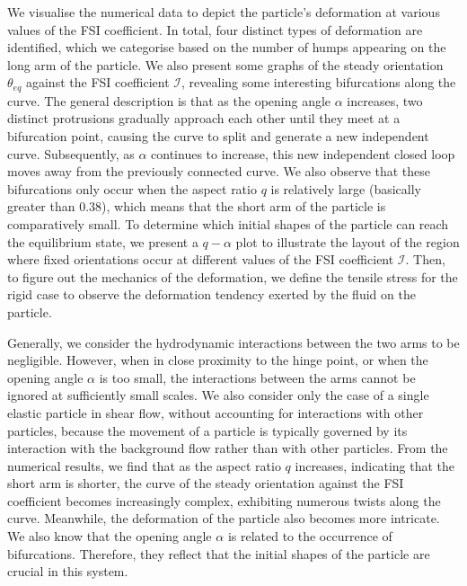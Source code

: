 \documentclass[12pt,MSc,twoside]{muthesis_2020}
\begin{document}
We visualise the numerical data to depict the particle's deformation at various values of the FSI coefficient. In total, four distinct types of deformation are identified, which we categorise based on the number of humps appearing on the long arm of the particle. We also present some graphs of the steady orientation $\theta_{eq}$ against the FSI coefficient $\mathcal{I}$, revealing some interesting bifurcations along the curve. The general description is that as the opening angle $\alpha$ increases, two distinct protrusions gradually approach each other until they meet at a bifurcation point, causing the curve to split and generate a new independent curve. Subsequently, as $\alpha$ continues to increase, this new independent closed loop moves away from the previously connected curve. We also observe that these bifurcations only occur when the aspect ratio $q$ is relatively large (basically greater than $0.38$), which means that the short arm of the particle is comparatively small. To determine which initial shapes of the particle can reach the equilibrium state, we present a $q-\alpha$ plot to illustrate the layout of the region where fixed orientations occur at different values of the FSI coefficient $\mathcal{I}$. Then, to figure out the mechanics of the deformation, we define the tensile stress for the rigid case to observe the deformation tendency exerted by the fluid on the particle.

Generally, we consider the hydrodynamic interactions between the two arms to be negligible. However, when in close proximity to the hinge point, or when the opening angle $\alpha$ is too small, the interactions between the arms cannot be ignored at sufficiently small scales. We also consider only the case of a single elastic particle in shear flow, without accounting for interactions with other particles, because the movement of a particle is typically governed by its interaction with the background flow rather than with other particles. From the numerical results, we find that as the aspect ratio $q$ increases, indicating that the short arm is shorter, the curve of the steady orientation against the FSI coefficient becomes increasingly complex, exhibiting numerous twists along the curve. Meanwhile, the deformation of the particle also becomes more intricate. We also know that the opening angle $\alpha$ is related to the occurrence of bifurcations. Therefore, they reflect that the initial shapes of the particle are crucial in this system.
\end{document}
